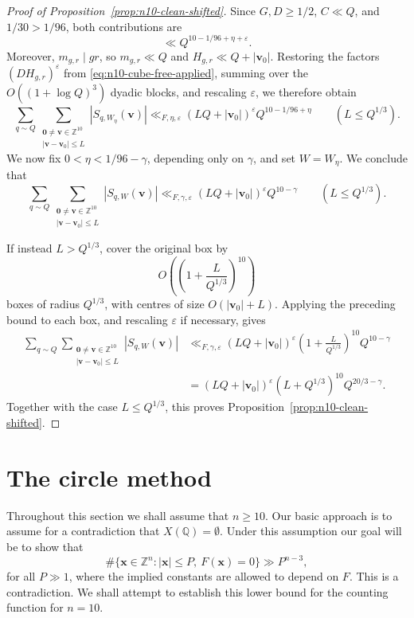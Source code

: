 \documentclass[a4paper,11pt, twoside,reqno]{amsart}
\theoremstyle{plain}
\theoremstyle{definition}
\theoremstyle{remark}
\newcommand{\bfv}{\bm{v}}
\newcommand{\ZZ}{\mathbb{Z}}
\newcommand{\QQ}{\mathbb{Q}}
\newcommand{\x}{\bm{x}}
\newcommand{\ve}{\varepsilon}
\renewcommand{\leq}{\leqslant}
\renewcommand{\geq}{\geqslant}
\numberwithin{equation}{section}
\begin{document}
\begin{proof}[Proof of Proposition~\ref{prop:n10-clean-shifted}]
Since $G,D\geq1/2$, $C\ll Q$, and $1/30>1/96$,
both contributions are
\[
\ll Q^{10-1/96+\eta+\ve}.
\]
Moreover, $m_{g,r}\mid gr$, so
$m_{g,r}\ll Q$ and $H_{g,r} \ll Q + |\bfv_0|$.
Restoring the factors $(DH_{g,r})^\ve$ from
\eqref{eq:n10-cube-free-applied}, summing over the
$O((1+\log Q)^3)$ dyadic blocks, and rescaling $\ve$,
we therefore obtain
\[
\sum_{q\sim Q}
\sum_{\substack{\bm0\ne\bfv\in\ZZ^{10}\\
|\bfv-\bfv_0|\leq L}}
|S_{q,W_\eta}(\bfv)|
\ll_{F,\eta,\ve}
(LQ+|\bfv_0|)^\ve Q^{10-1/96+\eta}
\qquad
(L\leq Q^{1/3}).
\]
We now fix $0<\eta<1/96-\gamma$, depending only on
$\gamma$, and set $W=W_\eta$.
We conclude that
\[
\sum_{q\sim Q}
\sum_{\substack{\bm0\ne\bfv\in\ZZ^{10}\\
|\bfv-\bfv_0|\leq L}}
|S_{q,W}(\bfv)|
\ll_{F,\gamma,\ve}
(LQ+|\bfv_0|)^\ve Q^{10-\gamma}
\qquad
(L\leq Q^{1/3}).
\]

If instead $L>Q^{1/3}$, cover the original box by
\[
O\left(\left(1+\frac{L}{Q^{1/3}}\right)^{10}\right)
\]
boxes of radius $Q^{1/3}$, with centres of size
$O(|\bfv_0|+L)$. Applying the preceding bound to each box,
and rescaling $\ve$ if necessary, gives
\[
\begin{split}
\sum_{q\sim Q}
\sum_{\substack{\bm0\ne\bfv\in\ZZ^{10}\\
|\bfv-\bfv_0|\leq L}}
|S_{q,W}(\bfv)|
&\ll_{F,\gamma,\ve}
(LQ+|\bfv_0|)^\ve
\left(1+\frac{L}{Q^{1/3}}\right)^{10}
Q^{10-\gamma}\\
&=
(LQ+|\bfv_0|)^\ve
(L+Q^{1/3})^{10}Q^{20/3-\gamma}.
\end{split}
\]
Together with the case $L\leq Q^{1/3}$, this proves
Proposition~\ref{prop:n10-clean-shifted}.
\end{proof}




\section{The circle method}
\label{sec:intro-circle}



Throughout this section we shall assume that $n\geq 10$.
Our basic approach is to assume for a contradiction that 
$X(\QQ)=\emptyset$.
Under this assumption our goal will be to show that 
$$
\#\{\x\in \ZZ^n: |\x|\leq P, ~F(\x)=0\}\gg P^{n-3},
$$
for all $P\gg 1$,  where the implied constants are allowed to depend  on $F$.
This is a contradiction. 
We shall attempt to establish this lower bound for the counting function for $n=10$.
\end{document}
